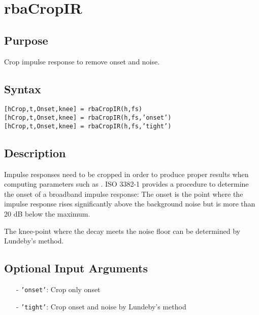
\chapter{rbaCropIR} %
\label{cha:rbaCropIR} %

\section{Purpose} %
\label{sec:rbaCropIR_purpose}
Crop impulse response to remove onset and noise.


\section{Syntax} %
\label{sec:rbaCropIR_syntax}


\texttt{[hCrop,t,Onset,knee] = rbaCropIR(h,fs)}\\
\texttt{[hCrop,t,Onset,knee] = rbaCropIR(h,fs,'onset')}\\
\texttt{[hCrop,t,Onset,knee] = rbaCropIR(h,fs,'tight')}\\

\section{Description} %
\label{sec:rbaCropIR_description}
Impulse responses need to be cropped in order to produce proper results when computing parameters such as \texttt{}. ISO 3382-1 provides a procedure to determine the onset of a broadband impulse response: The onset is the point where the impulse response rises significantly above the background noise but is more than 20 dB below the maximum.

The knee-point where the decay meets the noise floor can be determined by Lundeby's method.

\section{Optional Input Arguments} %
\label{sec:rbaCropIR_optional_input_arguments}
\begin{itemize}
	\item[-] \texttt{'onset'}: Crop only onset
	\item[-] \texttt{'tight'}: Crop onset and noise by Lundeby's method
\end{itemize}

